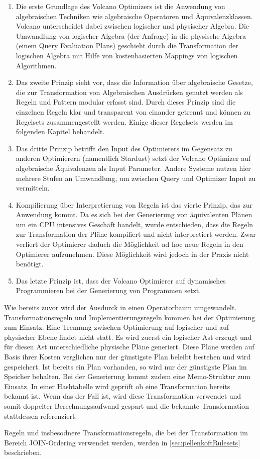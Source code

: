 \begin{enumerate}

\item Die erste Grundlage des Volcano Optimizers ist die Anwendung von algebraischen Techniken wie algebraische Operatoren und Äquivalenzklassen. Volcano unterscheidet dabei zwischen logischer und physischer Algebra. Die Umwandlung von logischer Algebra (der Anfrage) in die physische Algebra (einem Query Evaluation Plans) geschieht durch die Transformation der logischen Algebra mit Hilfe von kostenbasierten Mappings von logischen Algorithmen.


\item Das zweite Prinzip sieht vor, dass die Information über algebraische Gesetze, die zur Transformation von Algebraischen Ausdrücken genutzt werden als Regeln und Pattern modular erfasst sind. Durch dieses Prinzip sind die einzelnen Regeln klar und transparent von einander getrennt und können zu Regelsets zusammengestellt werden. Einige dieser Regelsets werden im folgenden Kapitel behandelt.


\item Das dritte Prinzip betrifft den Input des Optimierers im Gegensatz zu anderen Optimierern (namentlich Stardust) setzt der Volcano Optimizer auf algebraische Äquivalenzen als Input Parameter. Andere Systeme nutzen hier mehrere Stufen an Umwandlung, um zwischen Query und Optimizer Input zu vermitteln. 

\item Kompilierung über Interpretierung von Regeln ist das vierte Prinzip, das zur Anwendung kommt. Da es sich bei der Generierung von äquivalenten Plänen um ein CPU intensives Geschäft handelt, wurde entschieden, dass die Regeln zur Transformation der Pläne kompiliert und nicht interpretiert werden. Zwar verliert der Optimierer daduch die Möglichkeit ad hoc neue Regeln in den Optimierer aufzunehmen. Diese Möglichkeit wird jedoch in der Praxis nicht benötigt.

\item Das letzte Prinzip ist, dass der Volcano Optimierer auf dynamisches Programmieren bei der Generierung von Programmen setzt. 
\end{enumerate}


Wie bereits zuvor wird der Ausdurck in einen Operatorbaum umgewandelt. Transformationsregeln und Implementierungsregeln kommen bei der Optimierung zum Einsatz. Eine Trennung zwischen Optimierung auf logischer und auf physischer Ebene findet nicht statt. Es wird zuerst ein logischer Ast erzeugt und für diesen Ast unterschiedliche physische Pläne generiert. Diese Pläne werden auf Basis ihrer Kosten verglichen nur der günstigste Plan beleibt bestehen und wird gespeichert. Ist bereits ein Plan vorhanden, so wird nur der günstigste Plan im Speicher behalten. Bei der Generierung kommt zudem eine Memo-Struktur zum Einsatz. In einer Hashtabelle wird geprüft ob eine Transformation bereits bekannt ist. Wenn das der Fall ist, wird diese Transformation verwendet und somit doppelter Berechnungsaufwand gespart und die bekannte Transformation stattdessen referenziert.

Regeln und insbesodnere Transformationsregeln, die bei der Transformation im Bereich JOIN-Ordering verwendet werden, werden in \ref{sec:pellenkoftRulesets} beschrieben.

